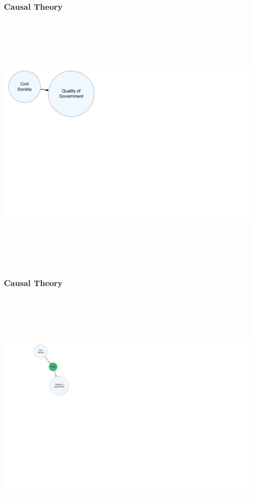 \documentclass[xcolor=x11names,compress]{beamer}\usepackage[]{graphicx}\usepackage[]{color}
\newenvironment{knitrout}{}{} %
\renewcommand{\(}{\begin{columns}}
\renewcommand{\)}{\end{columns}}
\newcommand{\<}[1]{\begin{column}{#1}}
\renewcommand{\>}{\end{column}}
\begin{document}
\begin{frame}
\frametitle{Causal Theory}
\begin{knitrout}
\color{fgcolor}

{\centering \includegraphics[width=800px,height=500]{figure/unnamed-chunk-2-1} 

}



\end{knitrout}
\end{frame}

\begin{frame}
\frametitle{Causal Theory}
\begin{knitrout}
\color{fgcolor}

{\centering \includegraphics[width=800px,height=500]{figure/unnamed-chunk-3-1} 

}



\end{knitrout}
\end{frame}
\end{document}
